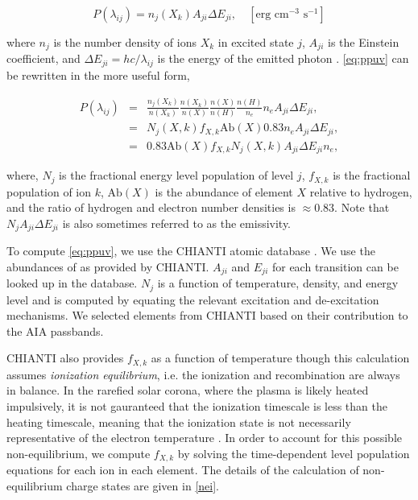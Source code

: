 \begin{equation}
    \label{eq:ppuv}
    P(\lambda_{ij}) = n_j(X_k)A_{ji}\Delta E_{ji},\quad[\text{erg cm}^{-3}\text{ s}^{-1}]
\end{equation}

where $n_j$ is the number density of ions $X_k$ in excited state $j$, $A_{ji}$ is the Einstein coefficient, and $\Delta E_{ji}=hc/\lambda_{ij}$ is the energy of the emitted photon  \citep[see][]{mason_spectroscopic_1994,bradshaw_collisional_2013}. \autoref{eq:ppuv} can be rewritten in the more useful form,

\begin{eqnarray*}
    P(\lambda_{ij}) &=& \frac{n_j(X_k)}{n(X_k)}\frac{n(X_k)}{n(X)}\frac{n(X)}{n(H)}\frac{n(H)}{n_e}n_eA_{ji}\Delta E_{ji}, \\
    &=& N_j(X,k) f_{X,k} \mathrm{Ab}(X) 0.83 n_e A_{ji} \Delta E_{ji}, \\
    &=& 0.83 \mathrm{Ab}(X) f_{X,k} N_j(X,k) A_{ji} \Delta E_{ji} n_e,
\end{eqnarray*}

where, $N_j$ is the fractional energy level population of level $j$, $f_{X,k}$ is the fractional population of ion $k$, $\mathrm{Ab}(X)$ is the abundance of element $X$ relative to hydrogen, and the ratio of hydrogen and electron number densities is $\approx0.83$. Note that $N_j A_{ji} \Delta E_{ji}$ is also sometimes referred to as the emissivity.

To compute \autoref{eq:ppuv}, we use the CHIANTI atomic database \citep{dere_chianti_1997,young_chianti_2016}. We use the abundances of \citet{feldman_potential_1992} as provided by CHIANTI. $A_{ji}$ and $E_{ji}$ for each transition can be looked up in the database. $N_j$ is a function of temperature, density, and energy level and is computed by equating the relevant excitation and de-excitation mechanisms. We selected elements from CHIANTI based on their contribution to the AIA passbands.

CHIANTI also provides $f_{X,k}$ as a function of temperature though this calculation assumes \textit{ionization equilibrium}, i.e. the ionization and recombination are always in balance. In the rarefied solar corona, where the plasma is likely heated impulsively, it is not gauranteed that the ionization timescale is less than the heating timescale, meaning that the ionization state is not necessarily representative of the electron temperature \citep{bradshaw_explosive_2006,reale_nonequilibrium_2008,bradshaw_numerical_2009}. In order to account for this possible non-equilibrium, we compute $f_{X,k}$ by solving the time-dependent level population equations for each ion in each element. The details of the calculation of non-equilibrium charge states are given in \autoref{nei}.

